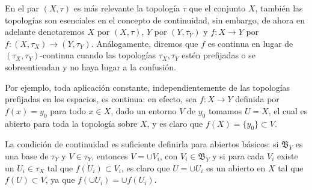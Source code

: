 \documentclass[12pt]{article}
\begin{document}
En el par $(X, \tau)$ es más relevante la topología $\tau$ que el conjunto $X$, también las topologías son esenciales en el concepto de continuidad, sin embargo, de ahora en adelante denotaremos $X$ por $(X, \tau)$, $Y$ por $(Y, \tau_Y)$ y $f \colon X \longrightarrow Y$ por $f \colon (X, \tau_X) \longrightarrow (Y, \tau_Y)$. Análogamente, diremos que $f$ es continua en lugar de $(\tau_X, \tau_Y)$-continua cuando las topologías $\tau_X, \tau_Y$ estén prefijadas o se sobreentiendan y no haya lugar a la confusión.

Por ejemplo, toda aplicación constante, independientemente de las topologías prefijadas en los espacios, es continua: en efecto, sea $f \colon X \longrightarrow Y$ definida por $f(x) = y_0$ para todo $x \in X$, dado un entorno $V$ de $y_0$ tomamos $U = X$, el cual es abierto para toda la topología sobre $X$, y es claro que $f(X) = \lbrace y_0 \rbrace \subset V$.

La condición de continuidad es suficiente definirla para abiertos básicos: si $\mathfrak{B}_Y$ es una base de $\tau_Y$ y $V \in \tau_Y$, entonces $V = \cup V_i$, con $V_i \in \mathfrak{B}_Y$ y si para cada $V_i$ existe un $U_i \in \tau_X$ tal que $f(U_i) \subset V_i$, es claro que $U = \cup U_i$ es un abierto en $X$ tal que $f(U) \subset V$, ya que $f(\cup U_i) = \cup f(U_i)$.
\end{document}
